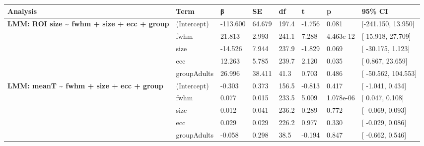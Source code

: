 \begin{table}
\centering
\begin{tabular}{>{}llllllll}
\toprule
Analysis & Term & β & SE & df & t & p & 95\% CI\\
\midrule
\textbf{LMM: ROI size \textasciitilde{} fwhm + size + ecc + group} & (Intercept) & -113.600 & 64.679 & 197.4 & -1.756 & 0.081 & {}[-241.150,  13.950]\\
\textbf{} & fwhm & 21.813 & 2.993 & 241.1 & 7.288 & 4.463e-12 & {}[  15.918,  27.709]\\
\textbf{} & size & -14.526 & 7.944 & 237.9 & -1.829 & 0.069 & {}[ -30.175,   1.123]\\
\textbf{} & ecc & 12.263 & 5.785 & 239.7 & 2.120 & 0.035 & {}[   0.867,  23.659]\\
\textbf{} & groupAdults & 26.996 & 38.411 & 41.3 & 0.703 & 0.486 & {}[ -50.562, 104.553]\\
\addlinespace
\textbf{LMM: meanT \textasciitilde{} fwhm + size + ecc + group} & (Intercept) & -0.303 & 0.373 & 156.5 & -0.813 & 0.417 & {}[  -1.041,   0.434]\\
\textbf{} & fwhm & 0.077 & 0.015 & 233.5 & 5.009 & 1.078e-06 & {}[   0.047,   0.108]\\
\textbf{} & size & 0.012 & 0.041 & 236.2 & 0.289 & 0.772 & {}[  -0.069,   0.093]\\
\textbf{} & ecc & 0.029 & 0.029 & 226.2 & 0.977 & 0.330 & {}[  -0.029,   0.086]\\
\textbf{} & groupAdults & -0.058 & 0.298 & 38.5 & -0.194 & 0.847 & {}[  -0.662,   0.546]\\
\bottomrule
\end{tabular}
\end{table}
